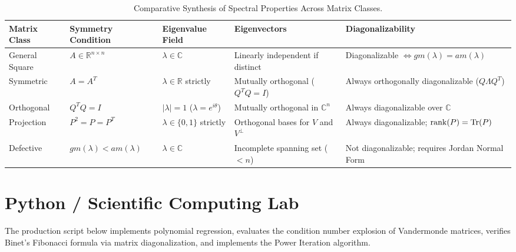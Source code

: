 \begin{table}[htbp]
\centering
\small
\begin{tabularx}{\textwidth}{lXXXX}
\toprule
\textbf{Matrix Class} & \textbf{Symmetry Condition} & \textbf{Eigenvalue Field} & \textbf{Eigenvectors} & \textbf{Diagonalizability} \\
\midrule
General Square & $A \in \mathbb{R}^{n \times n}$ & $\lambda \in \mathbb{C}$ & Linearly independent if distinct & Diagonalizable $\iff gm(\lambda) = am(\lambda)$ \\
\addlinespace
Symmetric & $A = A^T$ & $\lambda \in \mathbb{R}$ strictly & Mutually orthogonal ($Q^T Q = I$) & Always orthogonally diagonalizable ($Q \Lambda Q^T$) \\
\addlinespace
Orthogonal & $Q^T Q = I$ & $|\lambda| = 1$ ($\lambda = e^{i\theta}$) & Mutually orthogonal in $\mathbb{C}^n$ & Always diagonalizable over $\mathbb{C}$ \\
\addlinespace
Projection & $P^2 = P = P^T$ & $\lambda \in \{0, 1\}$ strictly & Orthogonal bases for $V$ and $V^\perp$ & Always diagonalizable; $\operatorname{rank}(P) = \operatorname{Tr}(P)$ \\
\addlinespace
Defective & $gm(\lambda) < am(\lambda)$ & $\lambda \in \mathbb{C}$ & Incomplete spanning set ($< n$) & Not diagonalizable; requires Jordan Normal Form \\
\bottomrule
\end{tabularx}
\caption{Comparative Synthesis of Spectral Properties Across Matrix Classes.}
\label{tab:matrix_classes}
\end{table}

\section{Python / Scientific Computing Lab}

The production script below implements polynomial regression, evaluates the condition number explosion of Vandermonde matrices, verifies Binet's Fibonacci formula via matrix diagonalization, and implements the Power Iteration algorithm.

